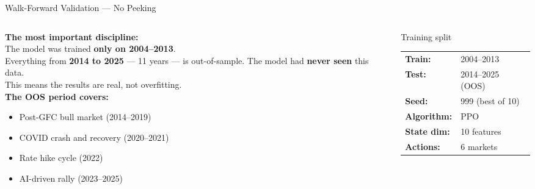 \documentclass[aspectratio=169,11pt]{beamer}
\begin{document}

\begin{frame}{Walk-Forward Validation --- No Peeking}
  \begin{columns}[T]
    \begin{column}{0.52\textwidth}
      \textbf{The most important discipline:}\\[0.6em]\normalsize
      The model was trained \textbf{only on 2004--2013}.\\[0.5em]
      Everything from \textbf{2014 to 2025} --- 11 years --- is out-of-sample. The model had \textbf{never seen} this data.\\[0.5em]
      This means the results are real, not overfitting.\\[0.8em]
      \textbf{The OOS period covers:}
      \begin{itemize}\small
        \setlength\itemsep{0.2em}
        \item Post-GFC bull market (2014--2019)
        \item COVID crash and recovery (2020--2021)
        \item Rate hike cycle (2022)
        \item AI-driven rally (2023--2025)
      \end{itemize}
    \end{column}
    \begin{column}{0.44\textwidth}
      \begin{block}{\centering Training split}
        \centering\vspace{0.4em}
        \begin{tabular}{ll}
          \textbf{Train:} & 2004--2013 \\
          \textbf{Test:}  & 2014--2025 (OOS) \\
          \textbf{Seed:}  & 999 (best of 10) \\
          \textbf{Algorithm:} & PPO \\
          \textbf{State dim:} & 10 features \\
          \textbf{Actions:}   & 6 markets \\
        \end{tabular}
        \vspace{0.3em}
      \end{block}
      \vspace{0.5em}

\end{column}
\end{columns}
\end{frame}
\end{document}
